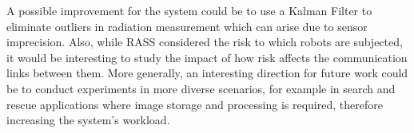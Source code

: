  A possible improvement for the system could be to use a Kalman Filter \cite{kalman1960new} to eliminate outliers in radiation measurement which can arise due to sensor imprecision. Also, while \ac{RASS} considered the risk to which robots are subjected, it would be interesting to study the impact of how risk affects the communication links between them. More generally, an interesting direction for future work could be to conduct experiments in more diverse scenarios, for example in search and rescue applications where image storage and processing is required, therefore increasing the system's workload.
